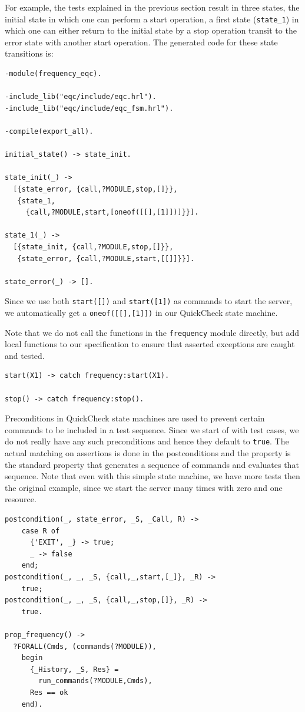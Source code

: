 \documentclass[]{sigplanconf}
\begin{document}
For example, the tests explained in the previous section result in three states, the initial state in which one can perform a start operation, a first state (\verb+state_1+) in which one can either return to the initial state by a stop operation transit to the error state with another start operation. The generated code for these state transitions is:
\begin{verbatim}
-module(frequency_eqc).

-include_lib("eqc/include/eqc.hrl").
-include_lib("eqc/include/eqc_fsm.hrl").

-compile(export_all).

initial_state() -> state_init.

state_init(_) ->
  [{state_error, {call,?MODULE,stop,[]}},
   {state_1,
     {call,?MODULE,start,[oneof([[],[1]])]}}].

state_1(_) ->
  [{state_init, {call,?MODULE,stop,[]}},
   {state_error, {call,?MODULE,start,[[]]}}].

state_error(_) -> [].
\end{verbatim}
Since we use both \verb+start([])+ and \verb+start([1])+ as commands to start the server, we automatically get a \verb+oneof([[],[1]])+ in our QuickCheck state machine.

Note that we do not call the functions in the \verb+frequency+ module directly, but add local functions to our specification to ensure that asserted exceptions are caught and tested.
\begin{verbatim}
start(X1) -> catch frequency:start(X1).

stop() -> catch frequency:stop().
\end{verbatim}

Preconditions in QuickCheck state machines are used to prevent certain commands to be included in a test sequence. Since we start of with test cases, we do not really have any such preconditions and hence they default to \verb+true+. The actual matching on assertions is done in the postconditions and the property is the standard property that generates a sequence of commands and evaluates that sequence. Note that even with this simple state machine, we 
have more tests then the original example, since we start the server many times with zero and one resource.
\begin{verbatim}
postcondition(_, state_error, _S, _Call, R) ->
    case R of
      {'EXIT', _} -> true;
      _ -> false
    end;
postcondition(_, _, _S, {call,_,start,[_]}, _R) ->
    true;
postcondition(_, _, _S, {call,_,stop,[]}, _R) ->
    true.

prop_frequency() ->
  ?FORALL(Cmds, (commands(?MODULE)),
    begin
      {_History, _S, Res} = 
        run_commands(?MODULE,Cmds), 
      Res == ok
    end).      
\end{verbatim}             
\end{document}
